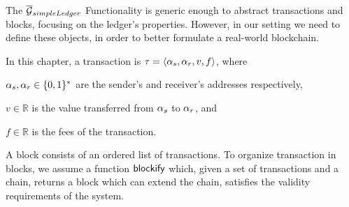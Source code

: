 
The ${\overline{\mathcal{G}}}_{simpleLedger}$ Functionality is generic enough to abstract transactions and
blocks, focusing on the ledger's properties. However, in our setting we need to
define these objects, in order to better formulate a real-world blockchain.

In this chapter, a transaction is $\tau = \langle \alpha_s,
\alpha_r, v, f \rangle$, where
\begin{inparaenum}[i)]
    \item $\alpha_s, \alpha_r \in \{0, 1\}^*$ are the sender's and receiver's
        addresses respectively,
    \item $v \in \mathbb{R}$ is the value transferred from $\alpha_s$ to
        $\alpha_r$, and
    \item $f \in \mathbb{R}$ is the fees of the transaction.
\end{inparaenum}
A block consists of an ordered list of transactions. To organize transaction in
blocks, we assume a function $\mathsf{blockify}$ which, given a set of transactions and
a chain, returns a block which can extend the chain, \ie satisfies the validity
requirements of the system.

